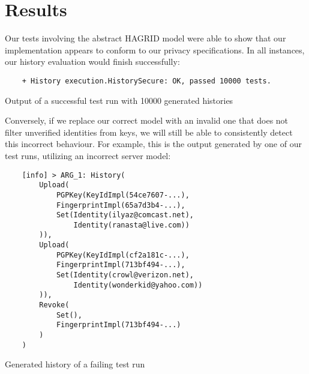 \section{Results}
\label{sec:results}
Our tests involving the abstract HAGRID model were able to show that our implementation appears to conform to our privacy specifications.
In all instances, our history evaluation would finish successfully: 
\begin{code}
    \begin{verbatim}
    + History execution.HistorySecure: OK, passed 10000 tests.
    \end{verbatim}
    \caption{Output of a successful test run with 10000 generated histories}
\end{code} 
\bigskip 
Conversely, if we replace our correct model with an invalid one that does not filter unverified identities from keys, we will still be able to consistently detect this incorrect behaviour. For example, this is the output generated by one of our test runs, utilizing an incorrect server model: 
\begin{code}
    \begin{verbatim}
    [info] > ARG_1: History(
        Upload(
            PGPKey(KeyIdImpl(54ce7607-...),
            FingerprintImpl(65a7d3b4-...),
            Set(Identity(ilyaz@comcast.net), 
                Identity(ranasta@live.com))
        )), 
        Upload(
            PGPKey(KeyIdImpl(cf2a181c-...),
            FingerprintImpl(713bf494-...),
            Set(Identity(crowl@verizon.net), 
                Identity(wonderkid@yahoo.com))
        )), 
        Revoke(
            Set(),
            FingerprintImpl(713bf494-...)
        )
    )
    \end{verbatim}
    \caption{Generated history of a failing test run}
\end{code}

